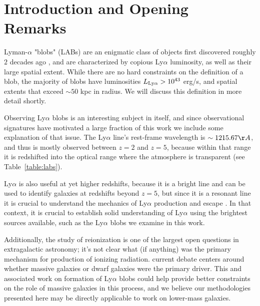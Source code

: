 \chapter{Introduction and Opening Remarks}
\label{sec:intro}

Lyman-$\alpha$ "blobs" (LABs) are an enigmatic class of objects first discovered roughly $2$ decades ago \citep{Fynbo1999,Steidel2000}, and are characterized by copious Ly$\alpha$ luminosity, as well as their large spatial extent.
While there are no hard constraints on the definition of a blob, the majority of blobs have luminosities $L_{\rm{Ly}\alpha} > 10^{43}$ erg/s, and spatial extents that exceed $\sim50$ kpc in radius.
We will discuss this definition in more detail shortly.

Observing Ly$\alpha$ blobs is an interesting subject in itself, and since observational signatures have motivated a large fraction of this work we include some explanation of that issue.
The Ly$\alpha$ line's rest-frame wavelength is $\sim 1215.67 \AA$, and thus is mostly observed between $z=2$ and $z=5$, because within that range it is redshifted into the optical range where the atmosphere is transparent (see Table~\ref{table:labs}).

Ly$\alpha$ is also useful at yet higher redshifts, because it is a bright line and can be used to identify galaxies at redshifts beyond $z=5$, but since it is a resonant line it is crucial to understand the mechanics of Ly$\alpha$ production and escape \citep{Ao2015}.
In that context, it is crucial to establish solid understanding of Ly$\alpha$ using the brightest sources available, such as the Ly$\alpha$ blobs we examine in this work.

Additionally, the study of reionization is one of the largest open questions in extragalactic astronomy; it's not clear what (if anything) was the primary mechanism for production of ionizing radiation.
 current debate centers around whether massive galaxies \citep{Naidu2019} or dwarf galaxies \citep{Finkelstein2019} were the primary driver.
This and associated work on formation of Ly$\alpha$ blobs could help provide better constraints on the role of massive galaxies in this process, and we believe our methodologies presented here may be directly applicable to work on lower-mass galaxies.  

